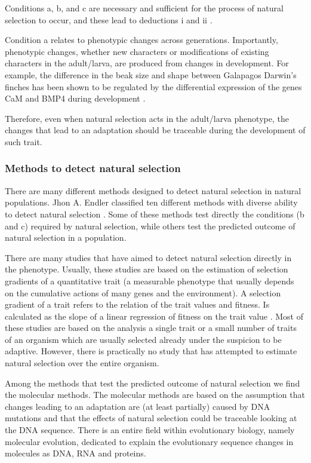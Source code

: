 Conditions a, b, and c are necessary and sufficient for the process of natural selection to occur, and these lead to deductions i and ii \citep{endler1986natural}.

Condition a relates to phenotypic changes across generations. Importantly, phenotypic changes, whether new characters or modifications of existing characters in the adult/larva, are produced from changes in development.
For example, the difference in the beak size and shape between Galapagos Darwin's finches has been shown to be regulated by the differential expression of the genes CaM and BMP4 during development \citep{Abzhanov2006}.

Therefore, even when natural selection acts in the adult/larva phenotype, the changes that lead to an adaptation should be traceable during the development of such trait.

\subsubsection{Methods to detect natural selection}

There are many different methods designed to detect natural selection in natural populations. Jhon A. Endler classified ten different methods with diverse ability to detect natural selection \citep{endler1986natural}. Some of these methods test directly the conditions (b and c) required by natural selection, while others test the predicted outcome of natural selection in a population.

There are many studies that have aimed to detect natural selection directly in the phenotype. Usually, these studies are based on the estimation of selection gradients of a quantitative trait (a measurable phenotype that usually depends on the cumulative actions of many genes and the environment). A selection gradient of a trait refers to the relation of the trait values and fitness. Is calculated as the slope of a linear regression of fitness on the trait value \citep{barton2007evolution}.
Most of these studies are based on the analysis a single trait or a small number of traits of an organism \citep{Hoekstra2001,Hereford2004} which are usually selected already under the suspicion to be adaptive. However, there is practically no study that has attempted to estimate natural selection over the entire organism.

Among the methods that test the predicted outcome of natural selection we find the molecular methods. The molecular methods are based on the assumption that changes leading to an adaptation are (at least partially) caused by DNA mutations and that the effects of natural selection could be traceable looking at the DNA sequence.
There is an entire field within evolutionary biology, namely molecular evolution, dedicated to explain the evolutionary sequence changes in molecules as DNA, RNA and proteins.

